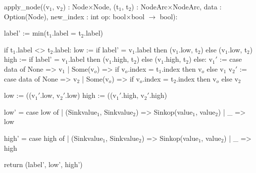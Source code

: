\begin{blstlisting}
  apply_node((v$_1$, v$_2$) : Node$\times$Node,
             (t$_1$, t$_2$) : NodeArc$\times$NodeArc,
             data : Option(Node),
             new_index : int
             op: bool$\times$bool $\rightarrow$ bool):

    label' := min(t$_1$.label = t$_2$.label)

    if t$_1$.label <>  t$_2$.label:
      low := if label' = v$_1$.label then (v$_1$.low, t$_2$) else (v$_1$.low, t$_2$)
      high := if label' = v$_1$.label then (v$_1$.high, t$_2$) else (v$_1$.high, t$_2$)
    else:
      v$_1'$ := case data of None => v$_1$
                     | Some(v$_o$) => if v$_o$.index = t$_1$.index
                                 then v$_o$ else v$_1$
      v$_2'$ := case data of None => v$_2$
                     | Some(v$_o$) => if v$_o$.index = t$_2$.index
                                 then v$_o$ else v$_2$

      low := ((v$_1'$.low, v$_2'$.low)
      high := ((v$_1'$.high, v$_2'$.high)

    low' = case low of
           | (Sink{value$_1$}, Sink{value$_2$}) =>  Sink{op(value$_1$, value$_2$)}
           | _ => low

    high' = case high of
            | (Sink{value$_1$}, Sink{value$_2$}) =>  Sink{op(value$_1$, value$_2$)}
            | _ => high

    return (label', low', high')
\end{blstlisting}
